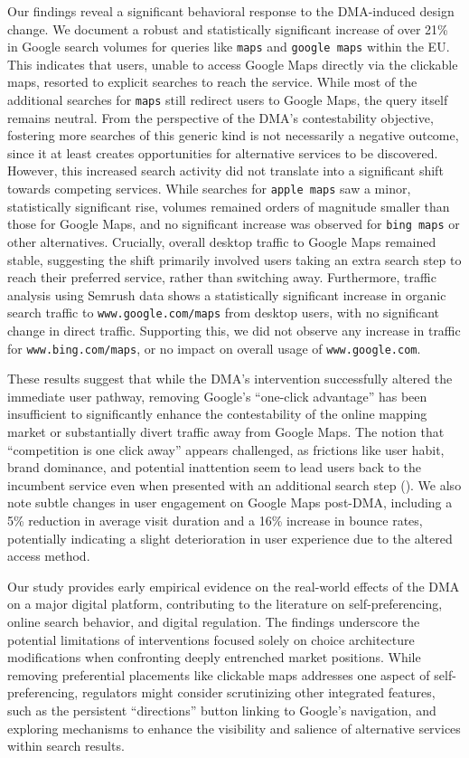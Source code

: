 \documentclass[11pt]{article}
\begin{document}
	Our findings reveal a significant behavioral response to the DMA-induced design change. We document a robust and statistically significant increase of over 21\% in Google search volumes for queries like \texttt{maps} and \texttt{google maps} within the EU. This indicates that users, unable to access Google Maps directly via the clickable maps, resorted to explicit searches to reach the service. While most of the additional searches for \texttt{maps} still redirect users to Google Maps, the query itself remains neutral. From the perspective of the DMA’s contestability objective, fostering more searches of this generic kind is not necessarily a negative outcome, since it at least creates opportunities for alternative services to be discovered. However, this increased search activity did not translate into a significant shift towards competing services. While searches for \texttt{apple maps} saw a minor, statistically significant rise, volumes remained orders of magnitude smaller than those for Google Maps, and no significant increase was observed for \texttt{bing maps} or other alternatives. Crucially, overall desktop traffic to Google Maps remained stable, suggesting the shift primarily involved users taking an extra search step to reach their preferred service, rather than switching away. Furthermore, traffic analysis using Semrush data shows a statistically significant increase in organic search traffic to \texttt{www.google.com/maps} from desktop users, with no significant change in direct traffic. Supporting this, we did not observe any increase in traffic for \texttt{www.bing.com/maps}, or no impact on overall usage of \texttt{www.google.com}.
	
	These results suggest that while the DMA's intervention successfully altered the immediate user pathway, removing Google's ``one-click advantage'' has been insufficient to significantly enhance the contestability of the online mapping market or substantially divert traffic away from Google Maps. The notion that ``competition is one click away'' appears challenged, as frictions like user habit, brand dominance, and potential inattention seem to lead users back to the incumbent service even when presented with an additional search step (\citealp{allcott2025sources}). We also note subtle changes in user engagement on Google Maps post-DMA, including a 5\% reduction in average visit duration and a 16\% increase in bounce rates, potentially indicating a slight deterioration in user experience due to the altered access method.
	
	Our study provides early empirical evidence on the real-world effects of the DMA on a major digital platform, contributing to the literature on self-preferencing, online search behavior, and digital regulation. The findings underscore the potential limitations of interventions focused solely on choice architecture modifications when confronting deeply entrenched market positions. While removing preferential placements like clickable maps addresses one aspect of self-preferencing, regulators might consider scrutinizing other integrated features, such as the persistent ``directions'' button linking to Google's navigation, and exploring mechanisms to enhance the visibility and salience of alternative services within search results.
	
\end{document}

